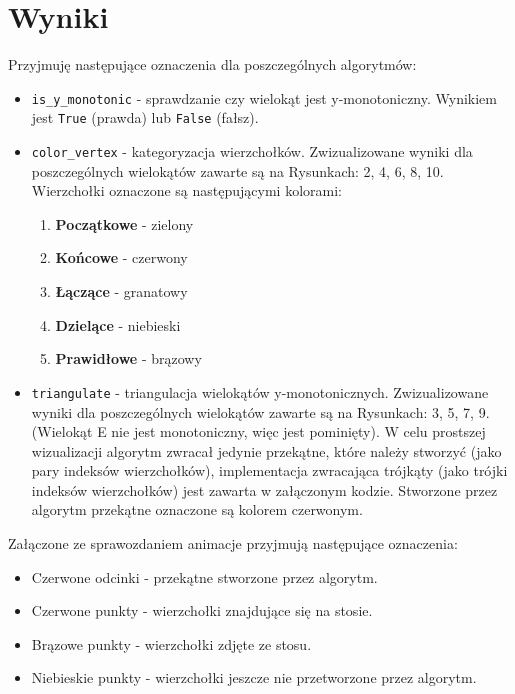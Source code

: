 \documentclass[11pt,a4paper]{article}
\begin{document}
\section{Wyniki}
Przyjmuję następujące oznaczenia dla poszczególnych algorytmów:
\begin{itemize}
    \item \verb|is_y_monotonic| - sprawdzanie czy wielokąt jest y-monotoniczny.
    Wynikiem jest \verb|True| (prawda) lub \verb|False| (fałsz).
    \item \verb|color_vertex| - kategoryzacja wierzchołków. 
    Zwizualizowane wyniki dla poszczególnych wielokątów 
    zawarte są na Rysunkach: 2, 4, 6, 8, 10.
    Wierzchołki oznaczone są następującymi kolorami:
    \begin{enumerate}
        \item \textbf{Początkowe} - zielony
        \item \textbf{Końcowe} - czerwony
        \item \textbf{Łączące} - granatowy
        \item \textbf{Dzielące} - niebieski
        \item \textbf{Prawidłowe} - brązowy
    \end{enumerate}
    \item \verb|triangulate| - triangulacja wielokątów y-monotonicznych. 
    Zwizualizowane wyniki dla poszczególnych wielokątów zawarte są 
    na Rysunkach: 3, 5, 7, 9.
    (Wielokąt E nie jest monotoniczny, więc jest pominięty). W celu prostszej
    wizualizacji algorytm zwracał jedynie przekątne, które należy stworzyć
    (jako pary indeksów wierzchołków), implementacja zwracająca trójkąty
    (jako trójki indeksów wierzchołków) jest zawarta w załączonym kodzie.
    Stworzone przez algorytm przekątne oznaczone są kolorem czerwonym.
\end{itemize}

Załączone ze sprawozdaniem animacje przyjmują następujące oznaczenia:
\begin{itemize}
    \item Czerwone odcinki - przekątne stworzone przez algorytm.
    \item Czerwone punkty  - wierzchołki znajdujące się na stosie.
    \item Brązowe punkty - wierzchołki zdjęte ze stosu.
    \item Niebieskie punkty - wierzchołki jeszcze nie przetworzone przez algorytm. 
\end{itemize}
\end{document}
